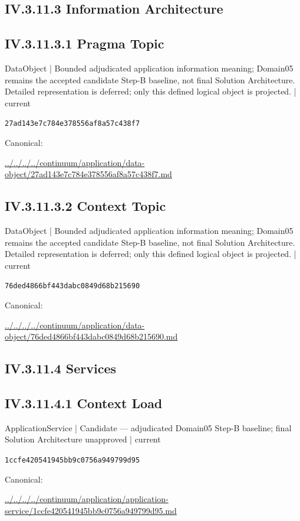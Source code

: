 \documentclass[10pt,a4paper]{article}
\begin{document}
\subsection*{IV.3.11.3 Information Architecture}
\subsection*{IV.3.11.3.1 Pragma Topic}
{\small DataObject | Bounded adjudicated application information meaning; Domain05 remains the accepted candidate Step-B baseline, not final Solution Architecture. Detailed representation is deferred; only this defined logical object is projected. | current}\par
\texttt{27ad143e7c784e378556af8a57c438f7}\par
Canonical: \par
{\footnotesize\url{../../../../continuum/application/data-object/27ad143e7c784e378556af8a57c438f7.md}}\par
\subsection*{IV.3.11.3.2 Context Topic}
{\small DataObject | Bounded adjudicated application information meaning; Domain05 remains the accepted candidate Step-B baseline, not final Solution Architecture. Detailed representation is deferred; only this defined logical object is projected. | current}\par
\texttt{76ded4866bf443dabc0849d68b215690}\par
Canonical: \par
{\footnotesize\url{../../../../continuum/application/data-object/76ded4866bf443dabc0849d68b215690.md}}\par
\subsection*{IV.3.11.4 Services}
\subsection*{IV.3.11.4.1 Context Load}
{\small ApplicationService | Candidate — adjudicated Domain05 Step-B baseline; final Solution Architecture unapproved | current}\par
\texttt{1ccfe420541945bb9c0756a949799d95}\par
Canonical: \par
{\footnotesize\url{../../../../continuum/application/application-service/1ccfe420541945bb9c0756a949799d95.md}}\par
\end{document}
